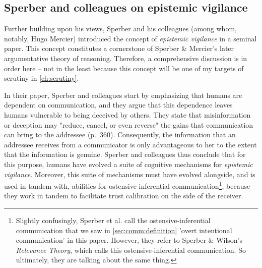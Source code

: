 \subsection{Sperber and colleagues on epistemic vigilance}
\label{sec:Sperber10}


Further building upon his \citeyear{Sperber01} views, Sperber and his colleagues (among whom, notably, Hugo Mercier) introduced the concept of \emph{epistemic vigilance} in a seminal \citeyear{Sperber10} paper. This concept constitutes a cornerstone of Sperber \& Mercier's later argumentative theory of reasoning. Therefore, a comprehensive discussion is in order here -- not in the least because this concept will be one of my targets of scrutiny in \cref{ch:scrutiny}.

In their \citeyear{Sperber10} paper, Sperber and colleagues start by emphasizing that humans are dependent on communication, and they argue that this dependence leaves humans vulnerable to being deceived by others.
They state that misinformation or deception may "reduce, cancel, or even reverse" the gains that communication can bring to the addressee (p.~360).
Consequently, the information that an addressee receives from a communicator is only advantageous to her to the extent that the information is genuine.
Sperber and colleagues thus conclude that for this purpose, humans have evolved a suite of cognitive mechanisms for \emph{epistemic vigilance}.
Moreover, this suite of mechanisms must have evolved alongside, and is used in tandem with, abilities for ostensive-inferential communication\footnote{Slightly confusingly, Sperber et al. call the ostensive-inferential communication that we saw in \cref{sec:comm:definition} 'overt intentional communication' in this paper. However, they refer to Sperber \& Wilson's \emph{Relevance Theory}, which calls this ostensive-inferential communication. So ultimately, they are talking about the same thing.}, because they work in tandem to facilitate trust calibration on the side of the receiver.

